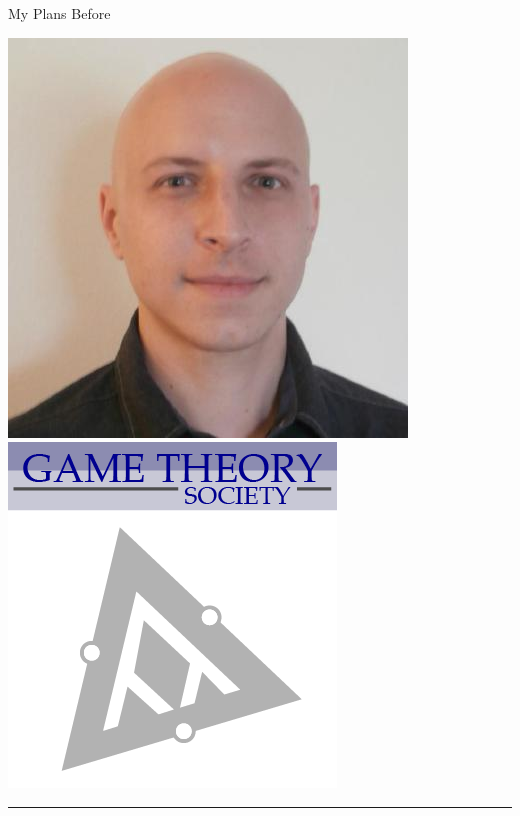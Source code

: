 \documentclass{beamer}
\begin{document}
\begin{frame}{My Plans Before}
\begin{center}
        \includegraphics[height=0.15\textheight]{static/marc.jpeg}
        \hspace{3cm}
        \includegraphics[height=0.2\textheight]{static/game-society.png}

        \rule{\textwidth}{2pt}
        \vspace{5pt}


\end{center}
\end{frame}
\end{document}

